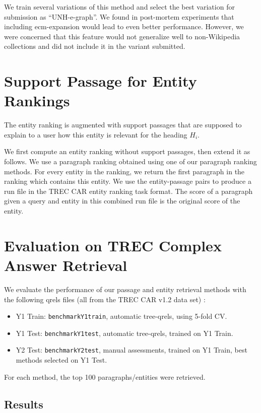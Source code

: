\documentclass{article}
\begin{document}
We train several variations of this method and select the best variation for submission as ``UNH-e-graph''. We found in post-mortem experiments that including ecm-expansion would lead to even better performance. However, we were concerned that this feature would not generalize well to non-Wikipedia collections and did not include it in the variant submitted.

\section{Support Passage for Entity Rankings}

The entity ranking is augmented with support passages that are supposed to explain to a user how this entity is relevant for the heading $H_i$.

We first compute an entity ranking without support passages, then extend it as follows. We use a paragraph ranking obtained using one of our paragraph ranking methods. For every entity in the ranking, we return the first paragraph in the ranking which contains this entity. We use the entity-passage pairs to produce a run file in the TREC CAR entity ranking task format. The score of a paragraph given a query and entity in this combined run file is the original score of the entity.


\section{Evaluation on TREC Complex Answer Retrieval}


We evaluate the performance of our passage and entity retrieval methods with the following qrels files (all from the TREC CAR v1.2 data set) \cite{trecdata21}:

\begin{itemize}
    \item Y1 Train: \texttt{benchmarkY1train}, automatic tree-qrels, using 5-fold CV.
    \item Y1 Test: \texttt{benchmarkY1test}, automatic tree-qrels, trained on Y1 Train.
    \item Y2 Test: \texttt{benchmarkY2test}, manual assessments, trained on Y1 Train, best methods selected on Y1 Test.
\end{itemize}

For each method, the top 100 paragraphs/entities were retrieved.

\subsection{Results}
\end{document}
